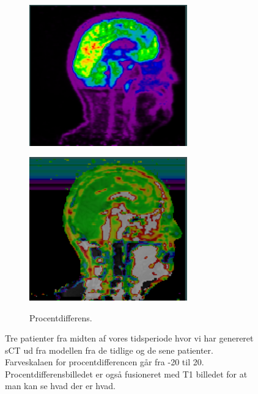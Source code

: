 \begin{figure}
\begin{subfigure}[b]{0.3\textwidth}
        \includegraphics[width=0.75\textwidth]{colager/over_tid_pet/over_tid_210445_late.png}
        \label{col:over_time_pet_pat3_late}
    \end{subfigure}\hfill
    \begin{subfigure}[b]{0.3\textwidth}
        \caption{Procentdifferens.}
        \includegraphics[width=0.75\textwidth]{colager/over_tid_pet/over_tid_210445_pd.png}
        \label{col:over_time_pet_pat3_pd}
    \end{subfigure}
    \caption{Tre patienter fra midten af vores tidsperiode hvor vi har genereret sCT ud fra modellen fra de tidlige og de sene patienter. Farveskalaen for procentdifferencen går fra -20 til 20. Procentdifferensbilledet er også fusioneret med T1 billedet for at man kan se hvad der er hvad.}
    \label{col:over_time_pet}
\end{figure}



